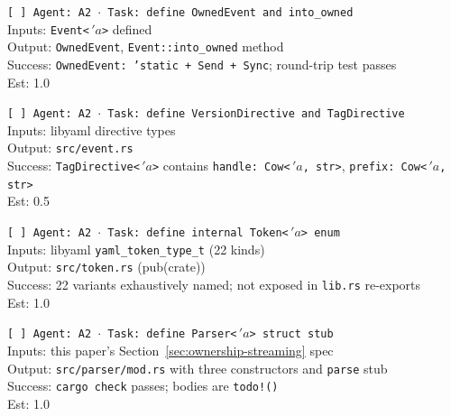 \documentclass[12pt]{article}
\theoremstyle{definition}
\theoremstyle{remark}
\newcommand{\lifetime}[1]{\ensuremath{\,'\!#1}}
\begin{document}
\begin{small}
\noindent\texttt{[ ] Agent: A2 $\cdot$ Task: define OwnedEvent and into\_owned}\\
\hspace*{2em}Inputs: \texttt{Event<\lifetime{a}>} defined\\
\hspace*{2em}Output: \texttt{OwnedEvent}, \texttt{Event::into\_owned} method\\
\hspace*{2em}Success: \texttt{OwnedEvent: 'static + Send + Sync}; round-trip test passes\\
\hspace*{2em}Est: 1.0

\noindent\texttt{[ ] Agent: A2 $\cdot$ Task: define VersionDirective and TagDirective}\\
\hspace*{2em}Inputs: libyaml directive types\\
\hspace*{2em}Output: \texttt{src/event.rs}\\
\hspace*{2em}Success: \texttt{TagDirective<\lifetime{a}>} contains \texttt{handle: Cow<\lifetime{a}, str>}, \texttt{prefix: Cow<\lifetime{a}, str>}\\
\hspace*{2em}Est: 0.5

\noindent\texttt{[ ] Agent: A2 $\cdot$ Task: define internal Token<\lifetime{a}> enum}\\
\hspace*{2em}Inputs: libyaml \texttt{yaml\_token\_type\_t} (22 kinds)\\
\hspace*{2em}Output: \texttt{src/token.rs} (pub(crate))\\
\hspace*{2em}Success: 22 variants exhaustively named; not exposed in \texttt{lib.rs} re-exports\\
\hspace*{2em}Est: 1.0

\noindent\texttt{[ ] Agent: A2 $\cdot$ Task: define Parser<\lifetime{a}> struct stub}\\
\hspace*{2em}Inputs: this paper's Section~\ref{sec:ownership-streaming} spec\\
\hspace*{2em}Output: \texttt{src/parser/mod.rs} with three constructors and \texttt{parse} stub\\
\hspace*{2em}Success: \texttt{cargo check} passes; bodies are \texttt{todo!()}\\
\hspace*{2em}Est: 1.0


\end{small}
\end{document}
